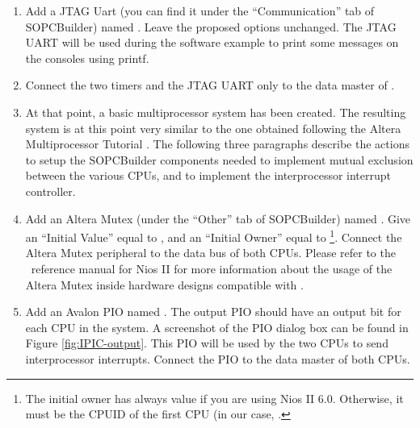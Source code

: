 \begin{enumerate}
\begin{figure}
\caption{\label{fig:tutorial_interval_timer_highres}When creating
, use a 1 ms periods.}
\end{figure}


\item Add a JTAG Uart (you can find it under the ``Communication'' tab
  of SOPCBuilder) named . Leave the proposed
  options unchanged. The JTAG UART will be used during the software
  example to print some messages on the consoles using printf.

\item Connect the two timers and the JTAG UART only to the data master
  of .

\item At that point, a basic multiprocessor system has been
  created. The resulting system is at this point very similar to the
  one obtained following the Altera Multiprocessor Tutorial
  \cite{Altera-multicpu-tutorial}. The following three paragraphs
  describe the actions to setup the SOPCBuilder components needed to
  implement mutual exclusion between the various CPUs, and to
  implement the interprocessor interrupt controller.

\item Add an Altera Mutex (under the ``Other'' tab of SOPCBuilder)
  named . Give an ``Initial Value'' equal to ,
  and an ``Initial Owner'' equal to \footnote{The initial
  owner has always value  if you are using Nios II
  6.0. Otherwise, it must be the CPUID of the first CPU (in our case,
  .}. Connect the Altera Mutex peripheral to the data bus
  of both CPUs. Please refer to the \ee\ reference manual for Nios II 
%
  for more information about the usage of the Altera Mutex inside
  hardware designs compatible with \ee.

\item Add an Avalon PIO named . The output PIO
  should have an output bit for each CPU in the system. A screenshot
  of the PIO dialog box can be found in 
  Figure \ref{fig:IPIC-output}. This
  PIO will be used by the two CPUs to send interprocessor
  interrupts. Connect the PIO to the data master of both CPUs.


\end{enumerate}
